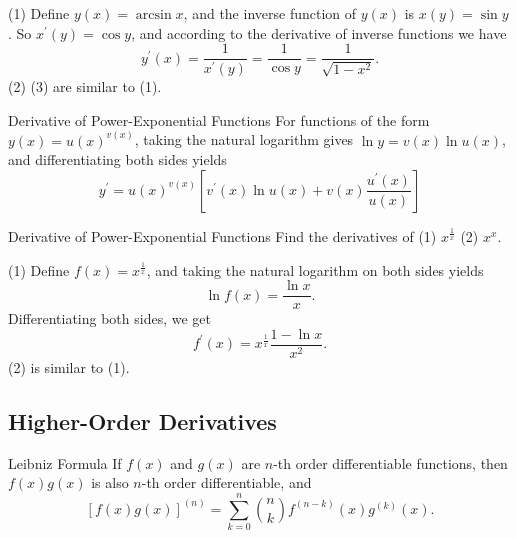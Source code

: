 \begin{solution}
  (1) Define $y(x) = \arcsin x$, and the inverse function of $y(x)$ is
  $x(y) = \sin y$. So $x^{\prime}(y) = \cos y$, and according to the derivative
  of inverse functions we have
  \begin{equation}
    y^{\prime}(x) = \frac{1}{x^{\prime}(y)} = \frac{1}{\cos y} = \frac{1}{\sqrt{1 - x^2}}.
  \end{equation}
  (2) (3) are similar to (1).
\end{solution}

\begin{proposition}{Derivative of Power-Exponential Functions}{}
  For functions of the form $y(x) = u(x)^{v(x)}$,
  taking the natural logarithm gives $\ln y = v(x) \ln u(x)$,
  and differentiating both sides yields
  \begin{equation}
    y^{\prime}=u(x)^{v(x)}\left[v^{\prime}(x)\ln u(x)+v(x)\frac{u^{\prime}(x)}{u(x)}\right]
  \end{equation}
\end{proposition}

\begin{example}{Derivative of Power-Exponential Functions}{}
  Find the derivatives of (1) $x^{\frac{1}{x}}$
  (2) $x^x$.
\end{example}

\begin{solution}
  (1) Define $f(x) = x^{\frac{1}{x}}$, and
  taking the natural logarithm on both sides yields
  \begin{equation}
    \ln f(x) = \frac{\ln x}{x}.
  \end{equation}
  Differentiating both sides, we get
  \begin{equation}
    f^{\prime}(x) = x^{\frac{1}{x}} \frac{1 - \ln x}{x^2}.
  \end{equation}
  (2) is similar to (1).
\end{solution}

\subsection{Higher-Order Derivatives}

\begin{proposition}{Leibniz Formula}{}
  If $f(x)$ and $g(x)$ are $n$-th order differentiable functions,
  then $f(x)g(x)$ is also $n$-th order differentiable, and
  \begin{equation}
    \left[ f(x)g(x) \right]^{(n)} = \sum\limits_{k = 0}^n \binom{n}{k} f^{(n-k)}(x) g^{(k)}(x).
  \end{equation}
\end{proposition}

